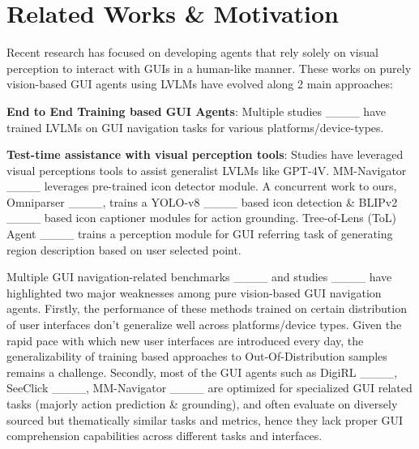 \section{Related Works \& Motivation}
Recent research has focused on developing agents that rely solely on visual perception to interact with GUIs in a human-like manner. These works on purely vision-based GUI agents using LVLMs have evolved along 2 main approaches:

\textbf{End to End Training based GUI Agents}: Multiple studies ____ have trained LVLMs on GUI navigation tasks for various platforms/device-types. 



\textbf{Test-time assistance with visual perception tools}: Studies have leveraged visual perceptions tools to assist generalist LVLMs like GPT-4V. MM-Navigator ____ leverages pre-trained icon detector module. A concurrent work to ours, Omniparser ____, trains a YOLO-v8 ____ based icon detection \& BLIPv2 ____ based icon captioner modules for action grounding. Tree-of-Lens (ToL) Agent ____ trains a perception module for GUI referring task of generating region description based on user selected point. 

Multiple GUI navigation-related benchmarks ____ and studies ____ have highlighted two major weaknesses among pure vision-based GUI navigation agents. Firstly, the performance of these methods trained on certain distribution of user interfaces don't generalize well across platforms/device types. Given the rapid pace with which new user interfaces are introduced every day, the generalizability of training based approaches to Out-Of-Distribution samples remains a challenge. Secondly, most of the GUI agents such as DigiRL ____, SeeClick ____,  MM-Navigator ____ are optimized for specialized GUI related tasks (majorly action prediction \& grounding), and often evaluate on diversely sourced but thematically similar tasks and metrics, hence they lack proper GUI comprehension capabilities across different tasks and interfaces.

